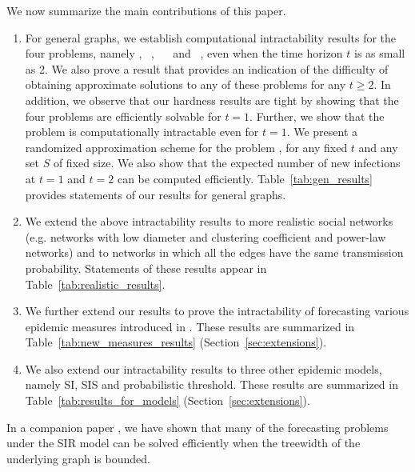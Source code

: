 We now summarize the main contributions of this paper.
\begin{enumerate}
\item For general graphs, we establish computational intractability results for 
the four problems, namely \tNewInfs,~ \tTotInfs,~ \tVuls{}~ and~ \tTotVuls,
even when the time horizon $t$ is as small as 2.
We also prove a result that provides an indication of the difficulty
of obtaining approximate solutions to any of these problems 
for any $t \geq 2$. 
In addition, we observe that our hardness results are tight by showing that the
four problems are efficiently solvable for $t = 1$.
Further, we show that the \tPeak{} problem is computationally
intractable even for $t = 1$. 
We present a randomized approximation scheme for the problem
\tTotVuls, for any fixed $t$ and any set $S$ of fixed size.
We also show that the expected number of new infections at $t = 1$ and
$t = 2$ can  be computed efficiently. 
Table~\ref{tab:gen_results} provides statements of
our results for general graphs.

\item We extend the above intractability results to more
realistic social networks (e.g. networks with low diameter and
clustering coefficient and power-law networks) and to networks
in which all the edges have the same transmission probability.
Statements of these results appear in Table~\ref{tab:realistic_results}.

\item We further extend our results to prove the intractability 
of forecasting various epidemic measures introduced in \cite{TC+2016}.
These results are summarized in Table~\ref{tab:new_measures_results} 
(Section~\ref{sec:extensions}).

\item We also extend our intractability results to
three other epidemic models, namely SI, SIS and
probabilistic threshold.
These results are summarized in Table~\ref{tab:results_for_models} 
(Section~\ref{sec:extensions}).
\end{enumerate}
In a companion paper \cite{Rosenkrantz_etal_2016}, we have shown that
many of the forecasting problems under the SIR model can be solved efficiently
when the treewidth \cite{Bod93} of the underlying graph is bounded. 

\medskip

